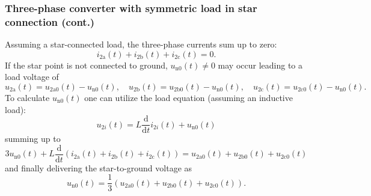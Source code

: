\begin{frame}
    \frametitle{Three-phase converter with symmetric load in star connection (cont.)}
    Assuming a star-connected load, the three-phase currents sum up to zero:
    \begin{equation}
       i_{2\mathrm{a}}(t) + i_{2\mathrm{b}}(t) + i_{2\mathrm{c}}(t) = 0.
       \label{eq:three_phase_current_sum_star}
    \end{equation}
    If the star point is not connected to ground, $u_{\mathrm{n}0}(t)\neq 0$ may occur leading to a load voltage of 
    \begin{equation}
        u_{2\mathrm{a}}(t) = u_{2\mathrm{a}0}(t) - u_{\mathrm{n}0}(t), \quad u_{2\mathrm{b}}(t) = u_{2\mathrm{b}0}(t) - u_{\mathrm{n}0}(t), \quad u_{2\mathrm{c}}(t) = u_{2\mathrm{c}0}(t) - u_{\mathrm{n}0}(t).
    \end{equation} 
    To calculate $u_{\mathrm{n}0}(t)$ one can utilize the load equation (assuming an inductive load):
    \begin{equation}
        u_{2i}(t) = L \frac{\mathrm{d}}{\mathrm{d}t} i_{2i}(t) + u_{\mathrm{n}0}(t)
    \end{equation}
    summing up to
    \begin{equation}
        3u_{\mathrm{n}0}(t) +  L \frac{\mathrm{d}}{\mathrm{d}t} \left(i_{2\mathrm{a}}(t) + i_{2\mathrm{b}}(t) + i_{2\mathrm{c}}(t)\right) = u_{2\mathrm{a}0}(t) + u_{2\mathrm{b}0}(t) +u_{2\mathrm{c}0}(t)
    \end{equation}
    and finally delivering the star-to-ground voltage as 
    \begin{equation}
        u_{\mathrm{n}0}(t) = \frac{1}{3} \left(u_{2\mathrm{a}0}(t) + u_{2\mathrm{b}0}(t) +u_{2\mathrm{c}0}(t)\right).
    \end{equation}
\end{frame}

